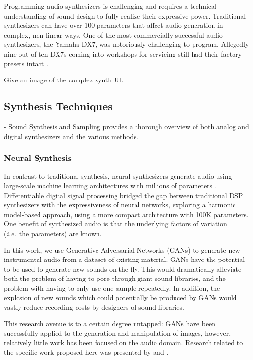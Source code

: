 Programming audio synthesizers is challenging and requires a technical understanding of sound design to fully realize their expressive power. Traditional synthesizers can have over 100 parameters that affect audio generation in complex, non-linear ways. One of the most commercially successful audio synthesizers, the Yamaha DX7, was notoriously challenging to program. Allegedly nine out of ten DX7s coming into workshops for servicing still had their factory presets intact \cite{seago2004critical}.

Give an image of the complex synth UI.

\subsection{Synthesis Techniques}
- Sound Synthesis and Sampling provides a thorough overview of both analog and digital synthesizers and the various methods. \cite{russ2012sound}

\subsubsection{Neural Synthesis}
In contrast to traditional synthesis, neural synthesizers generate audio using large-scale machine learning architectures with millions of parameters \cite{engel2017neural}. Differentiable digital signal processing \cite{engel2020ddsp} bridged the gap between traditional DSP synthesizers with the expressiveness of neural networks, exploring a harmonic model-based approach, using a more compact architecture with 100K parameters.
One benefit of synthesized audio is that the underlying factors of variation ({\em i.e.}~the parameters) are known.

In this work, we use Generative Adversarial Networks (GANs) \cite{goodfellow2014generative} to generate new instrumental audio from a dataset of existing material. GANs have the potential to be used to generate new sounds on the fly. This would dramatically alleviate both the problem of having to pore through giant sound libraries, and the problem with having to only use one sample repeatedly. In addition, the explosion of new sounds which could potentially be produced by GANs would vastly reduce recording costs by designers of sound libraries.

This research avenue is to a certain degree untapped: GANs have been successfully applied to the generation and manipulation of images, however, relatively little work has been focused on the audio domain. Research related to the specific work proposed here was presented by \cite{donahue2018adversarial}  and \cite{engel2018gansynth}.

